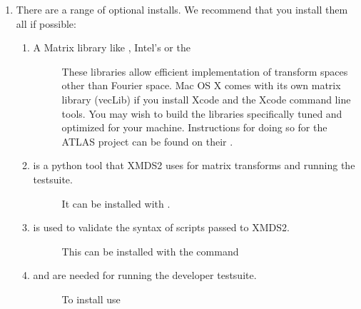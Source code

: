\documentclass[letterpaper,10pt,english]{sphinxmanual}
\begin{document}
\begin{enumerate}
\item {} 
\sphinxAtStartPar
There are a range of optional installs.  We recommend that you install them all if possible:
\begin{enumerate}
%
\item {} \begin{description}
\item[{A Matrix library like , Intel’s  or the }] \leavevmode
\sphinxAtStartPar
These libraries allow efficient implementation of transform spaces other than Fourier space.
Mac OS X comes with its own matrix library (vecLib) if you install Xcode and the Xcode command line tools.
You may wish to build the libraries specifically tuned and optimized for your machine. Instructions for doing so for the ATLAS project can be found on their .

\end{description}

\item {} \begin{description}
\item[{ is a python tool that XMDS2 uses for matrix transforms and running the testsuite.}] \leavevmode
\sphinxAtStartPar
It can be installed with .

\end{description}

\item {} \begin{description}
\item[{ is used to validate the syntax of scripts passed to XMDS2.}] \leavevmode
\sphinxAtStartPar
This can be installed with the command 

\end{description}

\item {} \begin{description}
\item[{ and  are needed for running the developer testsuite.}] \leavevmode
\sphinxAtStartPar
To install use 


\end{description}
\end{enumerate}
\end{enumerate}
\end{document}

